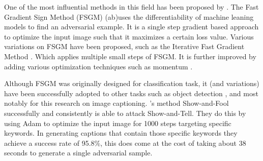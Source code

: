One of the most influential methods in this field has been proposed by \citeauthor{goodfellow2015explaining}. The Fast Gradient Sign Method (FSGM) (ab)uses the differentiability of machine leaning models to find an adversarial example. It is a single step gradient based approach to optimize the input image such that it maximizes a certain loss value. Various variations on FSGM have been proposed, such as the Iterative Fast Gradient Method \cite{Kurakin}. Which applies multiple small steps of FSGM. It is further improved by adding various optimization techniques such as momentum \cite{9237700}.

Although FSGM was originally designed for classification task, it (and variations) have been successfully adopted to other tasks such as object detection \cite{AdversarialAttacksOnFace,AdversarialFasterRCNN,DBLP:journals/corr/abs-1907-10310}, and most notably for this research on image captioning\cite{Hongge}. \citeauthor{Hongge}'s method Show-and-Fool successfully and consistently is able to attack Show-and-Tell\cite{showandtell}. They do this by using Adam\cite{kingma2017adam} to optimize the input image for 1000 steps targeting specific keywords. In generating captions that contain those specific keywords they achieve a success rate of 95.8\%, this does come at the cost of taking about 38 seconds to generate a single adversarial sample.

